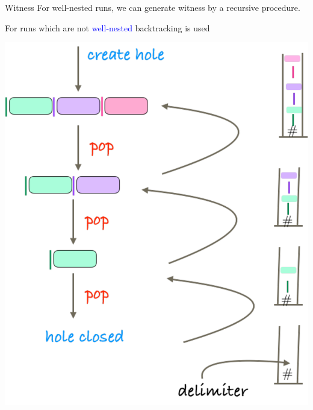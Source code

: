 \documentclass{beamer}
\begin{document}
        \begin{frame}{Witness}
  For well-nested runs, we can generate witness by a recursive
  procedure.

  \pause
      
  For runs which are not \textcolor{blue}{well-nested} backtracking is
  used
      

      
  \pause
     

\begin{center}
  \includegraphics[scale=0.15]{fig/witness-fig.pdf}
  \end{center}
\end{frame}
\end{document}
